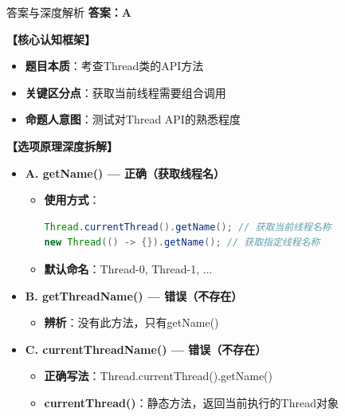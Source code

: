 \documentclass[12pt, a4paper]{ctexart}
\begin{document}
\begin{enumerate}[label=\textbf{\arabic*.}]
	      \begin{bluebox}{答案与深度解析}
		      \textbf{答案：A}

		      \textbf{【核心认知框架】}
		      \begin{itemize}[label={}, leftmargin=*, nosep]
			      \item \textbf{题目本质}：考查Thread类的API方法
			      \item \textbf{关键区分点}：获取当前线程需要组合调用
			      \item \textbf{命题人意图}：测试对Thread API的熟悉程度
		      \end{itemize}

		      \textbf{【选项原理深度拆解】}
					  \begin{itemize}[label={}, leftmargin=*, nosep]

		      \item \textbf{A. getName() — 正确（获取线程名）}
		      \begin{itemize}[label={}, leftmargin=*, nosep]
			      \item \textbf{使用方式}：
			            \begin{lstlisting}[language=Java]
Thread.currentThread().getName(); // 获取当前线程名称
new Thread(() -> {}).getName(); // 获取指定线程名称
      \end{lstlisting}
			      \item \textbf{默认命名}：Thread-0, Thread-1, ...
		      \end{itemize}

		      \item \textbf{B. getThreadName() — 错误（不存在）}
		      \begin{itemize}[label={}, leftmargin=*, nosep]
			      \item \textbf{辨析}：没有此方法，只有getName()
		      \end{itemize}

		      \item \textbf{C. currentThreadName() — 错误（不存在）}
		      \begin{itemize}[label={}, leftmargin=*, nosep]
			      \item \textbf{正确写法}：Thread.currentThread().getName()
			      \item \textbf{currentThread()}：静态方法，返回当前执行的Thread对象
		      \end{itemize}


\end{itemize}
\end{bluebox}
\end{enumerate}
\end{document}
